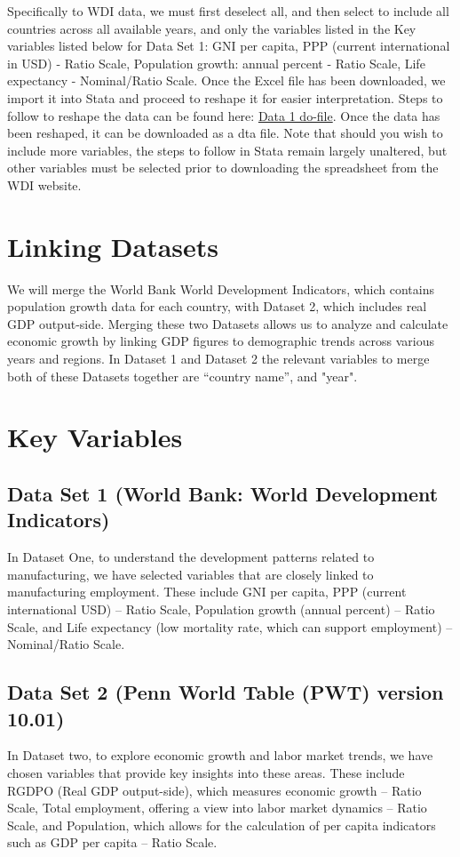 \documentclass[12pt]{article}
\begin{document}
Specifically to WDI data, we must first deselect all, and then select to include all countries across all available years, and only the variables listed in the Key variables listed below for Data Set 1: GNI per capita, PPP (current international in USD) - Ratio Scale, Population growth: annual percent -  Ratio Scale,  Life expectancy - Nominal/Ratio Scale. Once the Excel file has been downloaded, we import it into Stata and proceed to reshape it for easier interpretation. Steps to follow to reshape the data can be found here: \href{https://github.com/ecn310/course-project-development/blob/main/WDI.do}{Data 1 do-file}.
Once the data has been reshaped, it can be downloaded as a dta file. Note that should you wish to include more variables, the steps to follow in Stata remain largely unaltered, but other variables must be selected prior to downloading the spreadsheet from the WDI website. 


\section{Linking Datasets}
\label{sec:discussion}

We will merge the World Bank World Development Indicators, which contains population growth data for each country, with Dataset 2, which includes real GDP output-side. Merging these two Datasets allows us to analyze and calculate economic growth by linking GDP figures to demographic trends across various years and regions. In Dataset 1 and Dataset 2 the relevant variables to merge both of these Datasets together are “country name”, and "year". 


\section{Key Variables}
\label{sec:result}


\subsection{Data Set 1 (World Bank: World Development Indicators)}

In Dataset One, to understand the development patterns related to manufacturing, we have selected variables that are closely linked to manufacturing employment. These include GNI per capita, PPP (current international USD) – Ratio Scale, Population growth (annual percent) – Ratio Scale, and Life expectancy (low mortality rate, which can support employment) – Nominal/Ratio Scale.
  

\subsection{Data Set 2 (Penn World Table (PWT) version 10.01)}

In Dataset two, to explore economic growth and labor market trends, we have chosen variables that provide key insights into these areas. These include RGDPO (Real GDP output-side), which measures economic growth – Ratio Scale, Total employment, offering a view into labor market dynamics – Ratio Scale, and Population, which allows for the calculation of per capita indicators such as GDP per capita – Ratio Scale.
\end{document}
